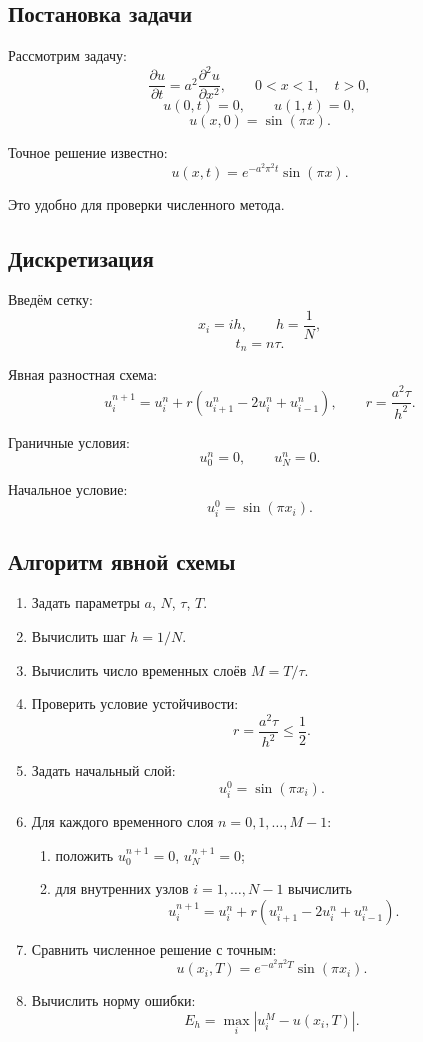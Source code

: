 \documentclass[12pt,a4paper]{article}
\theoremstyle{definition}
\theoremstyle{plain}
\begin{document}
\subsection{Постановка задачи}

Рассмотрим задачу:
\[
\frac{\partial u}{\partial t}
=
a^2 \frac{\partial^2 u}{\partial x^2},
\qquad
0<x<1,\quad t>0,
\]
\[
u(0,t)=0,\qquad u(1,t)=0,
\]
\[
u(x,0)=\sin(\pi x).
\]

Точное решение известно:
\[
u(x,t)=e^{-a^2\pi^2 t}\sin(\pi x).
\]

Это удобно для проверки численного метода.

\subsection{Дискретизация}

Введём сетку:
\[
x_i=ih,\qquad h=\frac{1}{N},
\]
\[
t_n=n\tau.
\]

Явная разностная схема:
\[
u_i^{n+1}
=
u_i^n
+
r(u_{i+1}^n-2u_i^n+u_{i-1}^n),
\qquad
r=\frac{a^2\tau}{h^2}.
\]

Граничные условия:
\[
u_0^n=0,\qquad u_N^n=0.
\]

Начальное условие:
\[
u_i^0=\sin(\pi x_i).
\]

\subsection{Алгоритм явной схемы}

\begin{enumerate}
    \item Задать параметры $a$, $N$, $\tau$, $T$.
    \item Вычислить шаг $h=1/N$.
    \item Вычислить число временных слоёв $M=T/\tau$.
    \item Проверить условие устойчивости:
    \[
    r=\frac{a^2\tau}{h^2}\le \frac12.
    \]
    \item Задать начальный слой:
    \[
    u_i^0=\sin(\pi x_i).
    \]
    \item Для каждого временного слоя $n=0,1,\dots,M-1$:
    \begin{enumerate}
        \item положить $u_0^{n+1}=0$, $u_N^{n+1}=0$;
        \item для внутренних узлов $i=1,\dots,N-1$ вычислить
        \[
        u_i^{n+1}
        =
        u_i^n+r(u_{i+1}^n-2u_i^n+u_{i-1}^n).
        \]
    \end{enumerate}
    \item Сравнить численное решение с точным:
    \[
    u(x_i,T)=e^{-a^2\pi^2T}\sin(\pi x_i).
    \]
    \item Вычислить норму ошибки:
    \[
    E_h=\max_i |u_i^M-u(x_i,T)|.
    \]
\end{enumerate}
\end{document}
